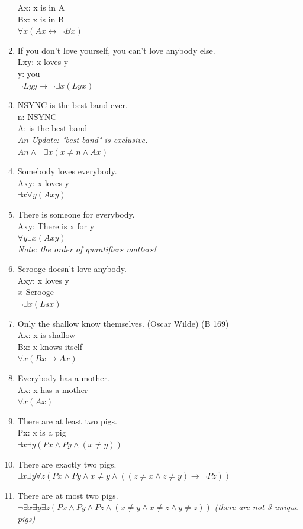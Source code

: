 \documentclass{article}
\begin{document}
\begin{enumerate}
            Ax: x is in A\\
            Bx: x is in B\\
            $\forall x(Ax \leftrightarrow \neg Bx)$
      \item If you don't love yourself, you can't love anybody else.\\
            Lxy: x loves y\\
            y: you\\
            $\neg Lyy \to \neg \exists x(Lyx)$
      \item NSYNC is the best band ever.\\
            n: NSYNC\\
            A: is the best band\\
            $An$
            \textit{Update: "best band" is exclusive.}\\
            $An  \land \neg \exists x (x \neq n \land Ax)$
      \item Somebody loves everybody.\\
            Axy: x loves y\\
            $\exists x \forall y (Axy)$
      \item There is someone for everybody.\\
            Axy: There is x for y\\
            $\forall y \exists x(Axy)$\\
            \textit{Note: the order of quantifiers matters!}
      \item Scrooge doesn't love anybody.\\
            Axy: x loves y\\
            s: Scrooge\\
            $\neg \exists x (Lsx)$
      \item Only the shallow know themselves. (Oscar Wilde) (B 169)\\
            Ax: x is shallow\\
            Bx: x knows itself\\
            $\forall x(Bx \to Ax)$
      \item Everybody has a mother.\\
            Ax: x has a mother\\
            $\forall x(Ax)$
      \item There are at least two pigs.\\
            Px: x is a pig\\
            $\exists x \exists y (Px \land Py \land (x \neq y))$
      \item There are exactly two pigs.\\
            $\exists x \exists y \forall z (Px \land Py \land x \neq y \land ((z \neq x \land z \neq y) \to \neg Pz))$
      \item There are at most two pigs.\\ 
            $\neg \exists x \exists y \exists z (Px \land Py \land Pz \land (x \neq y \land x \neq z \land y \neq z))$
            \textit{(there are not 3 unique pigs)}
      
\end{enumerate}
\end{document}
